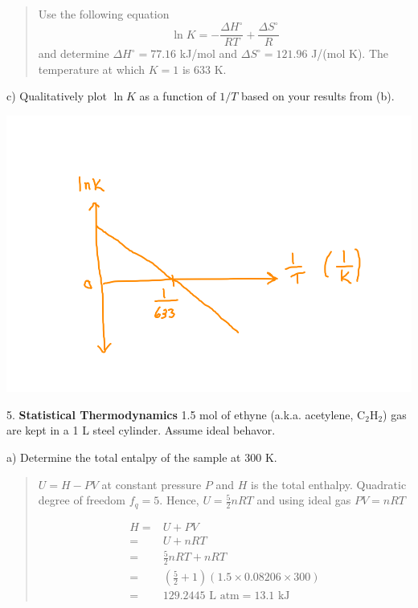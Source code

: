 \documentclass[11pt]{article}
\newcommand{\brian}[1]{
  {\begin{quote}
      \color{blue} #1
  \end{quote}}
}
\begin{document}
\brian{Use the following equation
  \begin{equation*}
      \ln K = -\frac{\Delta H^\circ}{RT} + \frac{\Delta S^\circ}{R}
  \end{equation*}
  and determine $\Delta H^\circ = 77.16$ kJ/mol and $\Delta S^\circ=121.96$ J/(mol K). The
  temperature at which $K=1$ is 633 K.
}

c) Qualitatively plot $\ln K$ as a function of $1/T$ based on your results from (b).

\begin{center}
  \includegraphics[scale=0.4]{vant_hoff.png}
\end{center}

%

5. \textbf{Statistical Thermodynamics} 1.5 mol of ethyne (a.k.a. acetylene, C$_2$H$_2$) gas
are kept in a 1 L steel cylinder. Assume ideal behavor.

a) Determine the total entalpy of the sample at 300 K.

\brian{$U = H - PV$ at constant pressure $P$ and $H$ is the total enthalpy. Quadratic degree
  of freedom $f_q = 5 $. Hence, $U = \frac{5}{2}nRT$ and using ideal gas $PV = nRT$

  \begin{align*}
    H = & U + PV \\
    = & U + nRT \\
    = & \frac{5}{2}nRT + nRT \\
    = & (\frac{5}{2} + 1)(1.5\times 0.08206 \times 300) \\
    = &  \text{129.2445 L atm} = 13.1 \text{ kJ}
  \end{align*}  
}
\end{document}
